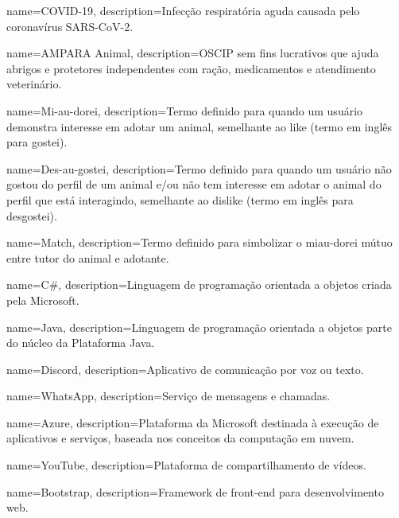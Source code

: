


 {
    name=COVID-19,
    description={Infecção respiratória aguda causada pelo coronavírus SARS-CoV-2.}
}

 {
    name=AMPARA Animal,
    description={\ac{OSCIP} sem fins lucrativos que ajuda abrigos e protetores independentes com ração, medicamentos e atendimento veterinário.}
}

 {
    name=Mi-au-dorei,
    description={Termo definido para quando um usuário demonstra interesse em adotar um animal, semelhante ao like (termo em inglês para gostei).}
}

 {
    name=Des-au-gostei,
    description={Termo definido para quando um usuário não gostou do perfil de um animal e/ou não tem interesse em adotar o animal do perfil que está interagindo, semelhante ao dislike (termo em inglês para desgostei).}
}

 {
    name=Match,
    description={Termo definido para simbolizar o miau-dorei mútuo entre tutor do animal e adotante.}
}

 {
    name=C\#,
    description={Linguagem de programação orientada a objetos criada pela Microsoft.}
}

 {
    name=Java,
    description={Linguagem de programação orientada a objetos parte do núcleo da Plataforma Java.}
}

 {
    name=Discord,
    description={Aplicativo de comunicação por voz ou texto.}
}

 {
    name=WhatsApp,
    description={Serviço de mensagens e chamadas.}
}

 {
    name=Azure,
    description={Plataforma da Microsoft destinada à execução de aplicativos e serviços, baseada nos conceitos da computação em nuvem.}
}

 {
    name=YouTube,
    description={Plataforma de compartilhamento de vídeos.}
}

 {
    name=Bootstrap,
    description={Framework de front-end para desenvolvimento web.}
}

